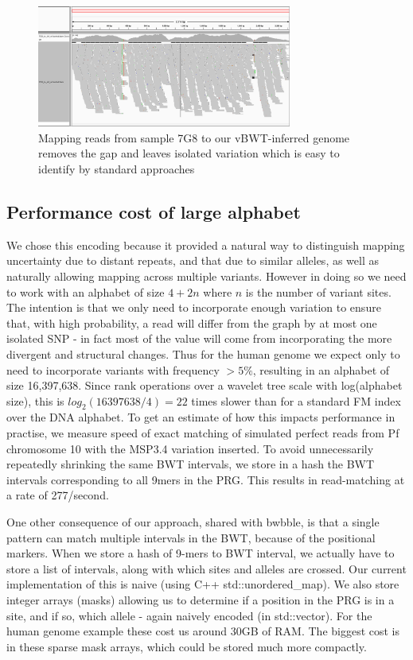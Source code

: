 \documentclass[runningheads,a4paper]{llncs}
\begin{document}
\begin{figure}
\centering
\includegraphics[height=4cm]{7G8_to_inf_ref_pileup.png}
\caption{Mapping reads from sample 7G8 to our vBWT-inferred genome removes the gap and leaves isolated variation which is easy to identify by standard approaches}
\label{fig:example}
\end{figure}




\subsection{Performance cost of large alphabet}
We chose this encoding because it provided a natural way to distinguish mapping uncertainty due to distant repeats, and that due to similar alleles, as well as naturally allowing mapping across multiple variants. However in doing so we need to work with an alphabet of size $4+2n$ where $n$ is the number of variant sites. The intention is that we only need to incorporate enough variation to ensure that, with high probability, a read will differ from the graph by at most one isolated SNP - in fact most of the value will come from incorporating the more divergent and structural changes. Thus for the human genome we expect only to need to incorporate variants with frequency $>5\%$, resulting in an alphabet of size 16,397,638. Since rank operations over a wavelet tree scale with log(alphabet size), this is $log_2(16397638/4)=22$ times slower than for a standard FM index over the DNA alphabet.  To get an estimate of how this impacts performance in practise, we measure speed of exact matching of simulated perfect reads from Pf chromosome 10 with the MSP3.4 variation inserted. To avoid unnecessarily repeatedly shrinking the same BWT intervals, we store  in a hash the  BWT intervals corresponding to all 9mers in the PRG. This results in read-matching at a rate of 277/second.

One other consequence of our approach, shared with bwbble, is that a single pattern can match multiple intervals in the BWT, because of the positional markers. When we store a hash of 9-mers to BWT interval, we actually have to store a list of intervals, along with which sites and alleles are crossed. Our current implementation of this is naive (using C++ std::unordered\_map). We also store integer arrays (masks) allowing us to determine if a position in the PRG is in a site, and if so, which allele - again naively encoded (in std::vector). For the human genome example these cost us around 30GB of RAM. The biggest cost is in these sparse mask arrays, which could be stored much more compactly.
\end{document}
